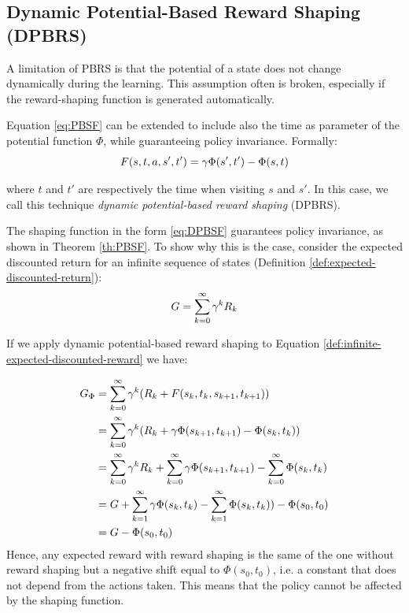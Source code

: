 \subsection{Dynamic Potential-Based Reward Shaping (DPBRS)}\label{sect:DPBRS}
A limitation of PBRS is that the potential of a state does not change dynamically during the learning. This assumption often is broken, especially if the reward-shaping function is generated automatically.
  
Equation \ref{eq:PBSF} can be extended to include also the time as parameter of the potential function $\Phi$, while guaranteeing policy invariance. Formally:
\begin{equation}\label{eq:DPBSF}
F(s, t, a, s', t') = \gamma\Phi(s', t') - \Phi(s, t)
\end{equation}

where $t$ and $t'$ are respectively the time when visiting $s$ and $s'$. In this case, we call this technique \emph{dynamic potential-based reward shaping} (DPBRS).

The shaping function in the form \ref{eq:DPBSF} guarantees policy invariance, as shown in Theorem \ref{th:PBSF}. To show why this is the case, consider the expected discounted return for an infinite sequence of states (Definition \ref{def:expected-discounted-return}):
\begin{equation}\label{def:infinite-expected-discounted-reward}
G = \sum_{k=0}^\infty \gamma^{k}R_k
\end{equation}

If we apply dynamic potential-based reward shaping to Equation \ref{def:infinite-expected-discounted-reward} we have:

\begin{align*}
G_{\Phi} &= \sum_{k=0}^\infty \gamma^{k} (R_k + F(s_k, t_k, s_{k+1}, t_{k+1}))\\
		&= \sum_{k=0}^\infty \gamma^{k} (R_k + \gamma\Phi(s_{k+1}, t_{k+1}) - \Phi(s_{k}, t_{k}) )\\
		&= \sum_{k=0}^\infty \gamma^{k} R_k + \sum_{k=0}^\infty \gamma\Phi(s_{k+1}, t_{k+1}) - \sum_{k=0}^\infty \Phi(s_{k}, t_{k}) \\
		&= G + \sum_{k=1}^\infty \gamma\Phi(s_k, t_k) - \sum_{k=1}^\infty \Phi(s_{k}, t_{k}) ) - \Phi(s_0, t_0)\\
		&= G - \Phi(s_0, t_0)
\end{align*}
Hence, any expected reward with reward shaping is the same of the one without reward shaping but a negative shift equal to $\Phi(s_0, t_0)$, i.e. a constant that does not depend from the actions taken. This means that the policy cannot be affected by the shaping function.

